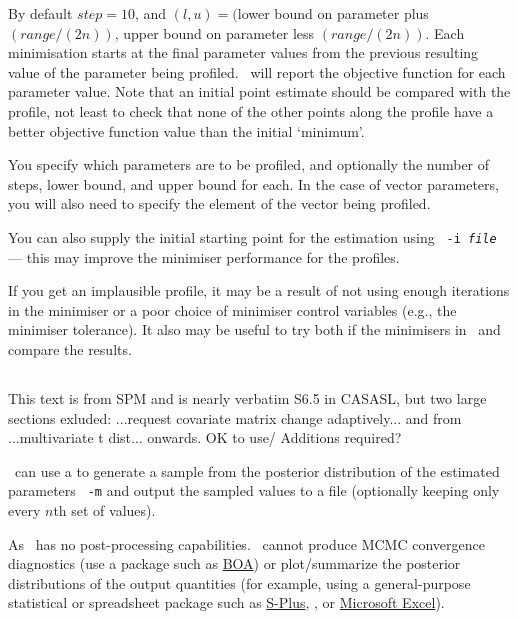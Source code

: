 By default $step=10$, and $(l, u)=($lower bound on parameter plus $(range/(2n))$, upper bound on parameter less $(range/(2n))$. Each minimisation starts at the final parameter values from the previous resulting value of the parameter being profiled. \CNAME\ will report the objective function for each parameter value. Note that an initial point estimate should be compared with the profile, not least to check that none of the other points along the profile have a better objective function value than the initial `minimum'.

You specify which parameters are to be profiled, and optionally the number of steps, lower bound, and upper bound for each. In the case of vector parameters, you will also need to specify the element of the vector being profiled. 

You can also supply the initial starting point for the estimation using \texttt{\cname\ -i \emph{file}} --- this may improve the minimiser performance for the profiles.

If you get an implausible profile, it may be a result of not using enough iterations in the minimiser or a poor choice of minimiser control variables (e.g., the minimiser tolerance). It also may be useful to try both if the minimisers in \CNAME\ and compare the results.

\subsection{\label{sec:estimate-MCMC}}
\CH
\KL This text is from SPM and is nearly verbatim S6.5 in CASASL, but two large sections exluded: ...request covariate matrix change adaptively... and from ...multivariate t dist... onwards. OK to use/ Additions required? \KLend

\CNAME\ can use a  to generate a sample from the posterior distribution of the estimated parameters \texttt{\cname\ -m} and output the sampled values to a file (optionally keeping only every $n$th set of values).

As \CNAME\ has no post-processing capabilities. \CNAME\ cannot produce MCMC convergence diagnostics (use a package such as \href{http://www.public-health.uiowa.edu/boa}{BOA}) or plot/summarize the posterior distributions of the output quantities (for example, using a general-purpose statistical or spreadsheet package such as \href{http://www.insightful.com}{S-Plus}, \href{http://www.r-project.org}{\R}, or \href{http://www.microsoft.com}{Microsoft Excel}).

